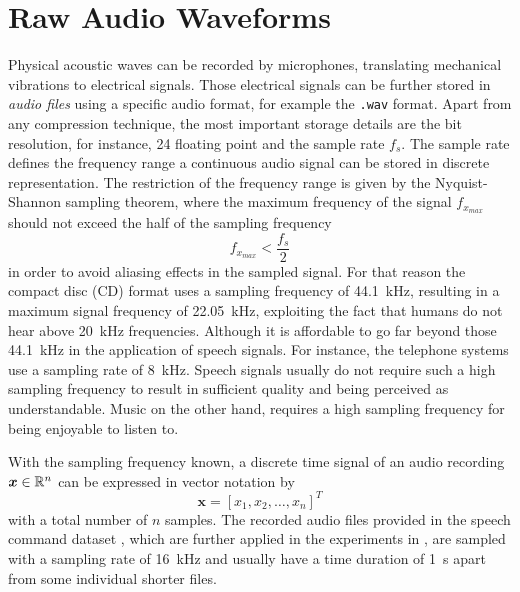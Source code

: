 
\section{Raw Audio Waveforms}\label{sec:signal_raw}
Physical acoustic waves can be recorded by microphones, translating mechanical vibrations to electrical signals. 
Those electrical signals can be further stored in \emph{audio files} using a specific audio format, for example the \texttt{.wav} format.
Apart from any compression technique, the most important storage details are the bit resolution, for instance, \SI{24}{\bit} floating point and the sample rate $f_s$.
The sample rate defines the frequency range a continuous audio signal can be stored in discrete representation.
The restriction of the frequency range is given by the Nyquist-Shannon sampling theorem, where the maximum frequency of the signal $f_{x_{max}}$ should not exceed the half of the sampling frequency
\begin{equation}\label{eq:signal_raw_nyquist}
  f_{x_{max}} < \frac{f_s}{2}
\end{equation}
in order to avoid aliasing effects in the sampled signal.
For that reason the compact disc (CD) format uses a sampling frequency of \SI{44.1}{\kilo\hertz}, resulting in a maximum signal frequency of \SI{22.05}{\kilo\hertz}, exploiting the fact that humans do not hear above \SI{20}{\kilo\hertz} frequencies.
Although it is affordable to go far beyond those \SI{44.1}{\kilo\hertz} in the application of speech signals. 
For instance, the telephone systems use a sampling rate of \SI{8}{\kilo\hertz}.
Speech signals usually do not require such a high sampling frequency to result in sufficient quality and being perceived as understandable.
Music on the other hand, requires a high sampling frequency for being enjoyable to listen to.

With the sampling frequency known, a discrete time signal of an audio recording $\bm{x} \in \mathbb{R}^n$ can be expressed in vector notation by
\begin{equation}\label{eq:signal_raw_x}
  \bm{x} = [x_1, x_2, \dots, x_n]^T
\end{equation}
with a total number of $n$ samples.
The recorded audio files provided in the speech command dataset \cite{Warden2018}, which are further applied in the experiments in , are sampled with a sampling rate of \SI{16}{\kilo\hertz} and usually have a time duration of \SI{1}{\second} apart from some individual shorter files.

